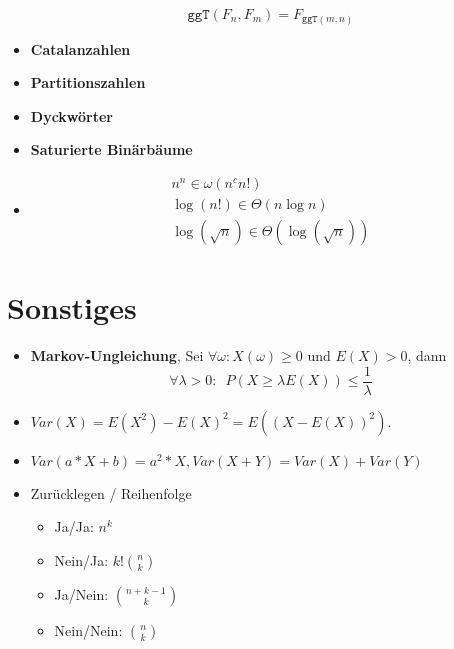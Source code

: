 \documentclass[landscape, 8pt, a4paper]{extarticle}
\newcommand{\ggT}{\texttt{ggT}}
\begin{document}
\begin{multicols}{3}
\begin{itemize}
		\begin{equation*}
			\ggT(F_n,F_m)=F_{\ggT(m,n)}
		\end{equation*}

		\item \textbf{Catalanzahlen}

		\item \textbf{Partitionszahlen}

		\item \textbf{Dyckwörter}

		\item \textbf{Saturierte Binärbäume}

		\item \begin{align*}
			n^n\in \omega(n^c n!)\\
			\log(n!)\in\Theta (n\log n)\\
			\log(\sqrt n)\in \Theta(\log(\sqrt n))
		\end{align*}

	\end{itemize}

	\section{Sonstiges}
	\begin{itemize}
		\item \textbf{Markov-Ungleichung}, Sei $\forall \omega: X(\omega)\geq 0$ und $E(X)>0$, dann
		\begin{equation*}
			\forall \lambda >0: \enspace P(X\geq \lambda E(X))\leq \frac 1\lambda
		\end{equation*}

		\item $Var(X)=E(X^2)-E(X)^2=E((X-E(X))^2)$.
		\item $Var(a*X+b)=a^2*X, Var(X+Y)=Var(X)+Var(Y)$

		\item Zurücklegen / Reihenfolge
		\begin{itemize}
			\item Ja/Ja: $n^k$
			\item Nein/Ja: $k!\binom nk$
			\item Ja/Nein: $\binom{n+k-1}{k}$
			\item Nein/Nein: $\binom nk$
		\end{itemize}
	\end{itemize}
\end{multicols}
\end{document}
